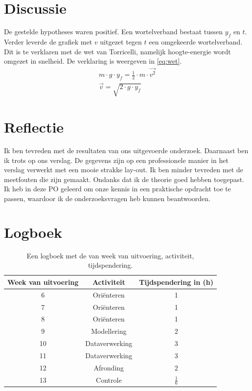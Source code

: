 \documentclass[numbers=endperiod]{scrartcl}
\begin{document}
\section{Discussie}
De gestelde hypotheses waren positief. Een wortelverband bestaat tussen $y_f$ en $t$. Verder leverde de grafiek met $v$ uitgezet tegen $t$ een omgekeerde wortelverband. Dit is te verklaren met de wet van Torricelli, namelijk hoogte-energie wordt omgezet in snelheid. De verklaring is weergeven in \cref{eq:wet}.
\begin{equation}\label{eq:wet}
\begin{split}
m \cdot g \cdot y_f = \frac{1}{2} \cdot m \cdot \vec{v^2}\\
\vec{v} = \sqrt{2 \cdot g \cdot y_f}
\end{split}
\end{equation}

\section{Reflectie}
Ik ben tevreden met de resultaten van ons uitgevoerde onderzoek. Daarnaast
ben ik trots op ons verslag. De gegevens zijn op een professionele
manier in het verslag verwerkt met een mooie strakke lay-out. Ik ben minder
tevreden met de meetfouten die zijn gemaakt. Ondanks dat ik de theorie
goed hebben toegepast. Ik heb in deze PO geleerd om onze kennis in
een praktische opdracht toe te passen, waardoor ik de onderzoeksvragen
heb kunnen beantwoorden.


\newpage
\appendix
\section{Logboek}
\begin{table}[ht]
\centering
\caption{Een logboek met de van week van uitvoering, activiteit, tijdspendering.}
\begin{tabular}{Scc}
\toprule
{Week van uitvoering} & Activiteit & Tijdspendering in (\si{\hour})\\
 & Oriënteren & 1\\
7 & Oriënteren & 1\\
8 & Oriënteren & 1\\
9 & Modellering & 2\\
10 & Dataverwerking & 3\\
11 & Dataverwerking & 3\\
12 & Afronding & 2\\
13 & Controle & $\frac{1}{6}$\\
\bottomrule
\end{tabular}
\end{table}
\end{document}

